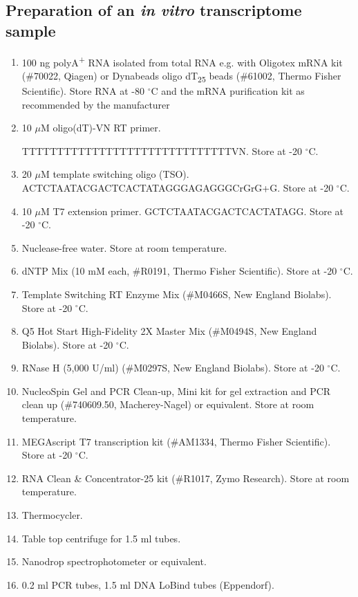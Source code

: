 \documentclass[times, 11pt, a4paper]{article}
\begin{document}
\subsection*{Preparation of an \emph{in vitro} transcriptome sample}
\begin{enumerate}
\item 100 ng polyA\textsuperscript{+} RNA isolated from total RNA e.g. with Oligotex mRNA kit (\#70022, Qiagen) or Dynabeads oligo dT\textsubscript{25} beads (\#61002, Thermo Fisher Scientific). Store RNA at -80 $^{\circ}$C and the mRNA purification kit as recommended by the manufacturer

\item 10 $\mu$M oligo(dT)-VN RT primer. 

TTTTTTTTTTTTTTTTTTTTTTTTTTTTTTVN. Store at -20 $^{\circ}$C.

\item 20 $\mu$M template switching oligo (TSO). ACTCTAATACGACTCACTATAGGGAGAGGGCrGrG+G. Store at -20 $^{\circ}$C.

\item 10 $\mu$M T7 extension primer. GCTCTAATACGACTCACTATAGG. Store at -20 $^{\circ}$C.

\item Nuclease-free water. Store at room temperature.

\item dNTP Mix (10 mM each, \#R0191, Thermo Fisher Scientific). Store at -20 $^{\circ}$C.

\item Template Switching RT Enzyme Mix (\#M0466S, New England Biolabs). Store at -20 $^{\circ}$C.

\item Q5 Hot Start High-Fidelity 2X Master Mix (\#M0494S, New England Biolabs). Store at -20 $^{\circ}$C.

\item RNase H (5,000 U/ml) (\#M0297S, New England Biolabs). Store at -20 $^{\circ}$C.

\item NucleoSpin Gel and PCR Clean‑up, Mini kit for gel extraction and PCR clean up (\#740609.50, Macherey-Nagel) or equivalent. Store at room temperature.

\item MEGAscript T7 transcription kit (\#AM1334, Thermo Fisher Scientific). Store at -20 $^{\circ}$C.

\item RNA Clean \& Concentrator-25 kit (\#R1017, Zymo Research). Store at room temperature.

\item Thermocycler.

\item Table top centrifuge for 1.5 ml tubes.

\item Nanodrop spectrophotometer or equivalent.

\item 0.2  ml PCR tubes, 1.5 ml DNA LoBind tubes (Eppendorf).

\end{enumerate}
\end{document}
